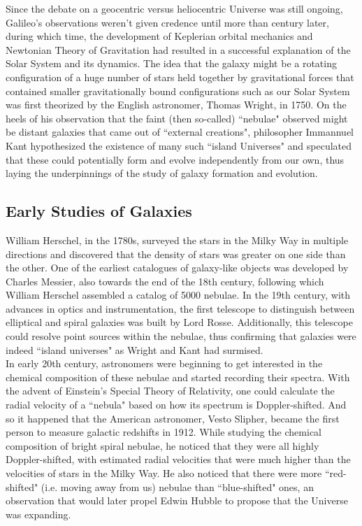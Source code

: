 Since the debate on a geocentric versus heliocentric Universe was still ongoing, Galileo's observations weren't given credence until more than century later, during which time, the development of Keplerian orbital mechanics and Newtonian Theory of Gravitation had resulted in a successful explanation of the Solar System and its dynamics. The idea that the galaxy might be a rotating configuration of a huge number of stars held together by gravitational forces that contained smaller gravitationally bound configurations such as our Solar System was first theorized by the English astronomer, Thomas Wright, in 1750. On the heels of his observation that the faint (then so-called) ``nebulae" observed might be distant galaxies that came out of ``external creations", philosopher Immannuel Kant \citep{book_agnes_clerke} hypothesized the existence of many such ``island Universes" and speculated that these could potentially form and evolve independently from our own, thus laying the underpinnings of the study of galaxy formation and evolution.\\

\subsection{Early Studies of Galaxies}

William Herschel, in the 1780s, surveyed the stars in the Milky Way in multiple directions and discovered that the density of stars was greater on one side than the other. One of the earliest catalogues of galaxy-like objects was developed by Charles Messier, also towards the end of the 18th century, following which William Herschel assembled a catalog of 5000 nebulae. In the 19th century, with advances in optics and instrumentation, the first telescope to distinguish between elliptical and spiral galaxies was built by Lord Rosse. Additionally, this telescope could resolve point sources within the nebulae, thus confirming that galaxies were indeed ``island universes" as Wright and Kant had surmised.\\

In early 20th century, astronomers were beginning to get interested in the chemical composition of these nebulae and started recording their spectra. With the advent of Einstein's Special Theory of Relativity, one could calculate the radial velocity of a ``nebula" based on how its spectrum is Doppler-shifted. And so it happened that the American astronomer, Vesto Slipher, became the first person to measure galactic redshifts in 1912. While studying the chemical composition of bright spiral nebulae, he noticed that they were all highly Doppler-shifted, with estimated radial velocities that were much higher than the velocities of stars in the Milky Way. He also noticed that there were more ``red-shifted" (i.e. moving away from us) nebulae than ``blue-shifted" ones, an observation that would later propel Edwin Hubble to propose that the Universe was expanding.\\

